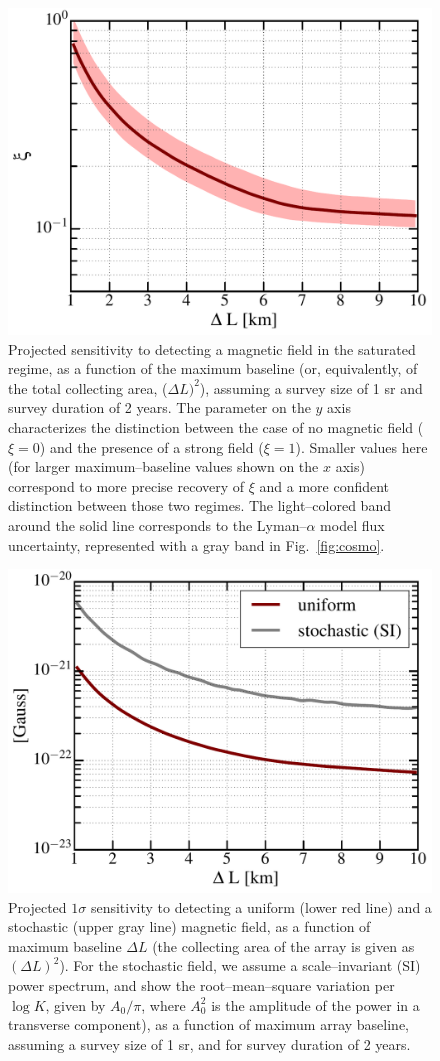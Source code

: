 \begin{figure}
\centering
\includegraphics[width=.35\textwidth,keepaspectratio=true]{xi_vs_deltas.pdf}
\caption{Projected sensitivity to detecting a magnetic field in the saturated regime, as a function of the maximum baseline (or, equivalently, of the total collecting area, ($\Delta L)^2$), assuming a survey size of 1 sr and survey duration of 2 years. The parameter on the $y$ axis characterizes the distinction between the case of no magnetic field ($\xi=0$) and the presence of a strong field ($\xi=1$). Smaller values here (for larger maximum--baseline values shown on the $x$ axis) correspond to more precise recovery of $\xi$ and a more confident distinction between those two regimes. The light--colored band around the solid line corresponds to the Lyman--$\alpha$ model flux uncertainty, represented with a gray band in Fig.~\ref{fig:cosmo}.\label{fig:xi_vs_deltas}}
\end{figure}
\begin{figure}
\centering
\includegraphics[width=.35\textwidth,keepaspectratio=true]{B_vs_deltas.pdf}
\caption{Projected $1\sigma$ sensitivity to detecting a uniform (lower red line) and a stochastic (upper gray line) magnetic field, as a function of maximum baseline $\Delta L$ (the collecting area of the array is given as $(\Delta L)^2$).  For the stochastic field, we assume a scale--invariant (SI) power spectrum, and show the root--mean--square variation per $\log K$, given by $A_0/\pi$, where $A_0^2$ is the amplitude of the power in a transverse component), as a function of maximum array baseline, assuming a survey size of 1 sr, and for survey duration of 2 years.\label{fig:B_vs_deltas}}
\end{figure}
